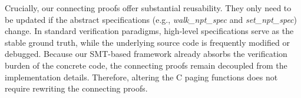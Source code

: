 Crucially, our connecting proofs offer substantial reusability. They only need to be updated if the abstract specifications (e.g., \textit{walk\_npt\_spec} and \textit{set\_npt\_spec}) change. In standard verification paradigms, high-level specifications serve as the stable ground truth, while the underlying source code is frequently modified or debugged. Because our SMT-based framework already absorbs the verification burden of the concrete code, the connecting proofs remain decoupled from the implementation details. Therefore, altering the C paging functions does not require rewriting the connecting proofs.

